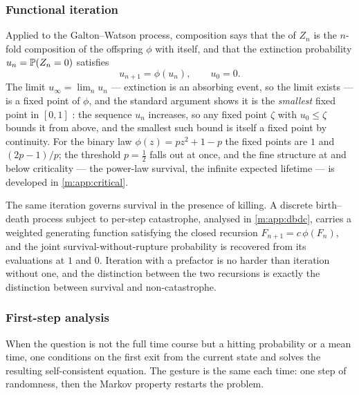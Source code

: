 \subsubsection{Functional iteration}
\label{m:sec:iteration}

Applied to the Galton--Watson process, composition says that the \pgf{} of
$Z_n$ is the $n$-fold composition of the offspring \pgf{} $\phi$ with itself,
and that the extinction probability $u_n=\mathbb{P}\!\left(Z_n=0\right)$ satisfies
\begin{equation*}
u_{n+1}=\phi(u_n),\qquad u_0=0 .
\end{equation*}
The limit $u_\infty=\lim_nu_n$ --- extinction is an absorbing event, so the
limit exists --- is a fixed point of $\phi$, and the standard argument shows it
is the \emph{smallest} fixed point in $[0,1]$ \cite{Harris1963}: the sequence
$u_n$ increases, so any fixed point $\zeta$ with $u_0\le\zeta$ bounds it from
above, and the smallest such bound is itself a fixed point by continuity. For
the binary law $\phi(z)=pz^2+1-p$ the fixed points are $1$ and $(2p-1)/p$; the
threshold $p=\tfrac12$ falls out at once, and the fine structure at and below
criticality --- the power-law survival, the infinite expected lifetime --- is
developed in \cref{m:app:critical}.

The same iteration governs survival in the presence of killing. A discrete
birth--death process subject to per-step catastrophe, analysed in
\cref{m:app:dbdc}, carries a weighted generating function satisfying the closed
recursion $F_{n+1}=c\,\phi(F_n)$, and the joint survival-without-rupture
probability is recovered from its evaluations at $1$ and $0$. Iteration with a
prefactor is no harder than iteration without one, and the distinction between
the two recursions is exactly the distinction between survival and
non-catastrophe.

\subsubsection{First-step analysis}
\label{m:sec:firststepdisc}

When the question is not the full time course but a hitting probability or a
mean time, one conditions on the first exit from the current state and solves
the resulting self-consistent equation. The gesture is the same each time: one
step of randomness, then the Markov property restarts the problem.


